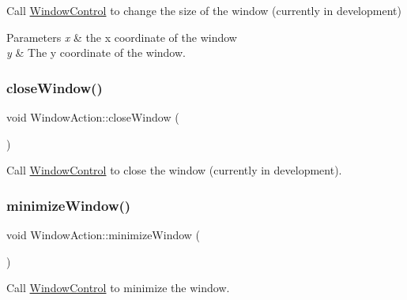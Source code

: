 Call \hyperlink{classUbuntuController_1_1WindowControl}{Window\+Control} to change the size of the window (currently in development)


\begin{DoxyParams}{Parameters}
{\em x} & the x coordinate of the window \\
\hline
{\em y} & The y coordinate of the window. \\
\hline
\end{DoxyParams}
\mbox{\label{classUbuntuController_1_1WindowAction_a99150ce49f2956c56e64b6ba0246424f}} 
\subsubsection{\texorpdfstring{close\+Window()}{closeWindow()}}
{\footnotesize\ttfamily void Window\+Action\+::close\+Window (\begin{DoxyParamCaption}{ }\end{DoxyParamCaption})}

Call \hyperlink{classUbuntuController_1_1WindowControl}{Window\+Control} to close the window (currently in development). \mbox{\label{classUbuntuController_1_1WindowAction_aa6f2b2543505c0c44027b501f151d4bf}} 
\subsubsection{\texorpdfstring{minimize\+Window()}{minimizeWindow()}}
{\footnotesize\ttfamily void Window\+Action\+::minimize\+Window (\begin{DoxyParamCaption}{ }\end{DoxyParamCaption})}

Call \hyperlink{classUbuntuController_1_1WindowControl}{Window\+Control} to minimize the window. \mbox{\label{classUbuntuController_1_1WindowAction_ae79c374bbbc84ff3dfb8565ede5f4220}} 
